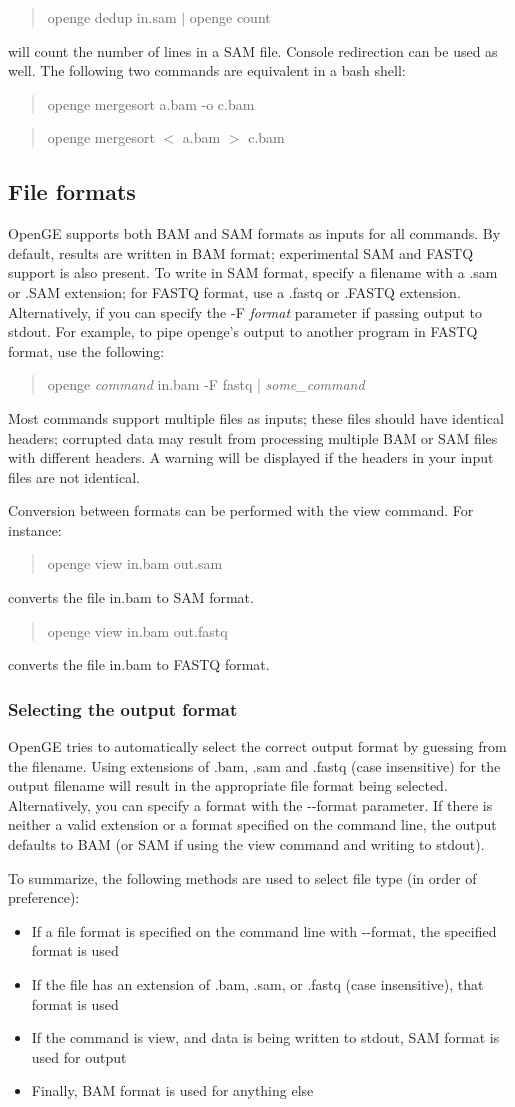 \documentclass[11pt]{article}
\newcommand {\cmd}[1] {\begin{quote}#1\end{quote}}
\begin{document}
\cmd{openge dedup in.sam $|$ openge count}

will count the number of lines in a SAM file. Console redirection can be used as well. The following two commands are equivalent in a bash shell:

\cmd{openge mergesort a.bam -o c.bam}
\cmd{openge mergesort $<$ a.bam $>$ c.bam}

\subsection {File formats}

OpenGE supports both BAM and SAM formats as inputs for all commands. By default, results are written in BAM format; experimental SAM and FASTQ support is also present. To write in SAM format, specify a filename with a .sam or .SAM extension; for FASTQ format, use a .fastq or .FASTQ extension. Alternatively, if you can specify the -F \textit{format} parameter if passing output to stdout. For example, to pipe openge's output to another program in FASTQ format, use the following:

\cmd{openge \textit{command} in.bam -F fastq | \textit{some\_command}}

Most commands support multiple files as inputs; these files should have identical headers; corrupted data may result from processing multiple BAM or SAM files with different headers. A warning will be displayed if the headers in your input files are not identical.

Conversion between formats can be performed with the view command. For instance:
\cmd{openge view in.bam out.sam}
converts the file in.bam to SAM format.

\cmd{openge view in.bam out.fastq}
converts the file in.bam to FASTQ format.

\subsubsection {Selecting the output format}
OpenGE tries to automatically select the correct output format by guessing from the filename. Using extensions of .bam, .sam and .fastq (case insensitive) for the output filename will result in the appropriate file format being selected. Alternatively, you can specify a format with the {-}{-}format parameter. If there is neither a valid extension or a format specified on the command line, the output defaults to BAM (or SAM if using the view command and writing to stdout).

To summarize, the following methods are used to select file type (in order of preference):
\begin{itemize}
\item If a file format is specified on the command line with {-}{-}format, the specified format is used
\item If the file has an extension of .bam, .sam, or .fastq (case insensitive), that format is used
\item If the command is view, and data is being written to stdout, SAM format is used for output
\item Finally, BAM format is used for anything else
\end{itemize}
\end{document}
